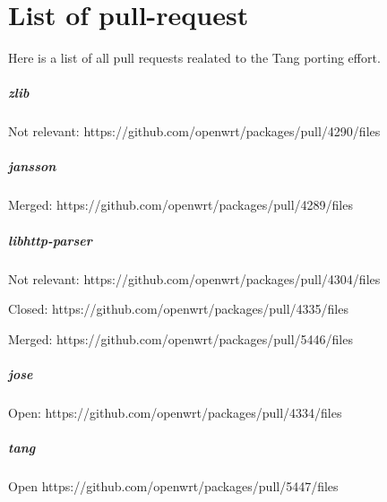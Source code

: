 \chapter{List of pull-request}\label{diffs}
Here is a list of all pull requests realated to the Tang porting effort.

\paragraph{zlib}

Not relevant:
https://github.com/openwrt/packages/pull/4290/files

\paragraph{jansson}

Merged:
https://github.com/openwrt/packages/pull/4289/files

\paragraph{libhttp-parser}

Not relevant:
https://github.com/openwrt/packages/pull/4304/files

Closed:
https://github.com/openwrt/packages/pull/4335/files

Merged:
https://github.com/openwrt/packages/pull/5446/files


\paragraph{jose}

Open:
https://github.com/openwrt/packages/pull/4334/files

\paragraph{tang}

Open
https://github.com/openwrt/packages/pull/5447/files

